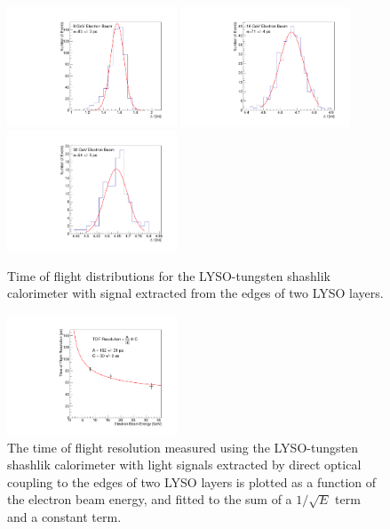 \documentclass[12pt]{article}
\begin{document}
\begin{figure}[H] \centering
\includegraphics[width=0.45\textwidth]{figs/TOF_ShashlikSideReadout_Electron_8GeV} 
\includegraphics[width=0.45\textwidth]{figs/TOF_ShashlikSideReadout_Electron_16GeV} 
\includegraphics[width=0.45\textwidth]{figs/TOF_ShashlikSideReadout_Electron_32GeV} 
\caption{ Time of flight distributions for the LYSO-tungsten shashlik calorimeter
with signal extracted from the edges of two LYSO layers. } 
\label{fig:ShashlikSideReadoutTOF}
\end{figure}

\begin{figure}[H] \centering
\includegraphics[width=0.45\textwidth]{figs/TimeResolutionVsEnergy_ShashlikSideReadout} 
\caption{ The time of flight resolution measured using the LYSO-tungsten shashlik calorimeter
with light signals extracted by direct optical coupling to the edges of two LYSO layers 
is plotted as a function of the electron beam energy, and fitted to the sum 
of a $1/\sqrt{E}$ term and a constant term. }
\label{fig:ShashlikSideReadoutTOFResolutionVsEnergy}
\end{figure}
\end{document}
